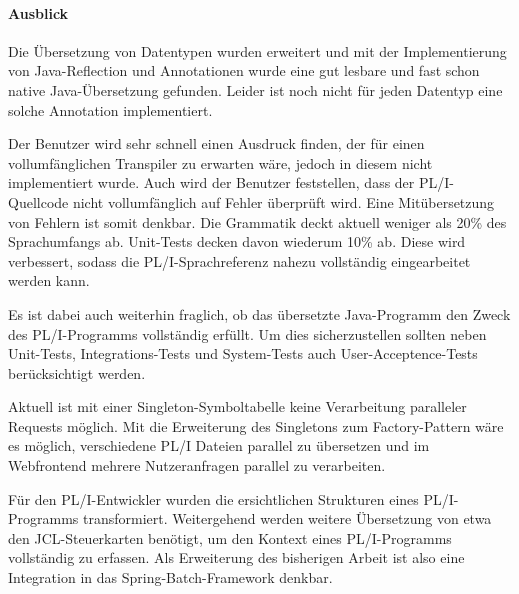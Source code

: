 \paragraph*{Ausblick} Die Übersetzung von Datentypen wurden erweitert und mit der Implementierung von Java-Reflection und Annotationen wurde eine gut lesbare und fast schon native Java-\newline Übersetzung gefunden. Leider ist noch nicht für jeden Datentyp eine solche Annotation implementiert. 

Der Benutzer wird sehr schnell einen Ausdruck finden, der für einen vollumfänglichen Transpiler zu erwarten wäre, jedoch in diesem nicht implementiert wurde.
Auch wird der Benutzer feststellen, dass der PL/I-Quellcode nicht vollumfänglich auf Fehler überprüft wird. Eine Mitübersetzung von Fehlern ist somit denkbar.
Die Grammatik deckt aktuell weniger als 20\% des Sprachumfangs ab. Unit-Tests decken davon wiederum 10\% ab.
Diese wird verbessert, sodass die PL/I-Sprachreferenz nahezu vollständig eingearbeitet werden kann.

Es ist dabei auch weiterhin fraglich, ob das übersetzte Java-Programm den Zweck des PL/I-Programms vollständig erfüllt. 
Um dies sicherzustellen sollten neben Unit-Tests, Integrations-Tests und System-Tests auch User-Acceptence-Tests berücksichtigt werden.

Aktuell ist mit einer Singleton-Symboltabelle keine Verarbeitung paralleler Requests möglich. Mit die Erweiterung des Singletons zum Factory-Pattern wäre es möglich, verschiedene PL/I Dateien parallel zu übersetzen und im Webfrontend mehrere Nutzeranfragen parallel zu verarbeiten. 

Für den PL/I-Entwickler wurden die ersichtlichen Strukturen eines PL/I-Programms transformiert. Weitergehend werden weitere Übersetzung von etwa den JCL-Steuerkarten benötigt, 
um den Kontext eines PL/I-Programms vollständig zu erfassen. Als Erweiterung des bisherigen Arbeit ist also eine Integration in das Spring-Batch-Framework denkbar.







